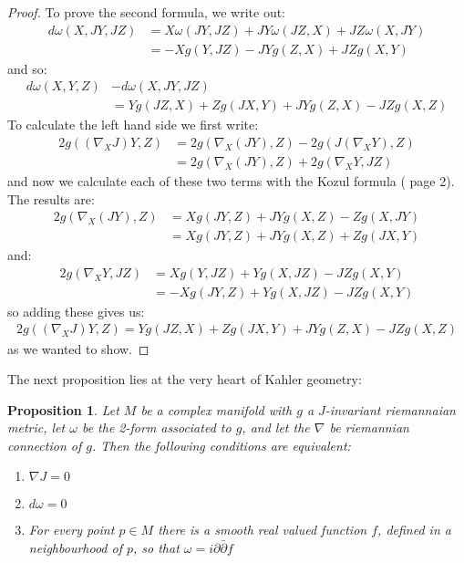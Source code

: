 \documentclass[11pt]{amsart}
\newtheorem{prop}[subsection]{Proposition}
\theoremstyle{definition}
\def \del{ \partial }
\def \delbar{ \bar{\partial} }
\begin{document}
\begin{proof}
To prove the second formula, we write out:
%
\begin{align*}
d \omega( X, JY, JZ ) &= X \omega( JY, JZ ) + JY \omega( JZ, X ) + JZ \omega( X, JY ) \\
&= - X g( Y, JZ ) - JY g( Z, X ) + JZ g( X, Y )
\end{align*}
%
and so:
%
\begin{align*}
d \omega( X, Y, Z ) &- d \omega( X, JY, JZ ) \\
&= Y g( JZ, X ) + Z g( JX, Y ) + JY g( Z, X ) - JZ g(X, Z)
\end{align*}
%
To calculate the left hand side we first write:
%
\begin{align*}
2 g( (\nabla_X J)Y, Z ) &= 2 g( \nabla_X (JY), Z ) - 2 g( J( \nabla_X Y ), Z ) \\
&= 2 g( \nabla_X (JY), Z ) + 2 g( \nabla_X Y, JZ )
\end{align*}
%
and now we calculate each of these two terms with the Kozul formula (\cite{CE} page 2).  The results are:
%
\begin{align*}
2 g( \nabla_X (JY), Z ) &= X g( JY, Z ) + JY g( X, Z ) - Z g( X, JY ) \\
&= X g( JY, Z ) + JY g( X, Z ) + Z g( JX, Y ) 
\end{align*}
%
and:
%
\begin{align*}
2 g( \nabla_X Y, JZ ) &= X g( Y, JZ ) + Y g( X, JZ ) - JZ g( X, Y ) \\
&=  - X g( JY, Z ) + Y g( X, JZ ) - JZ g( X, Y )
\end{align*}
%
so adding these gives us:
%
\begin{align*}
2 g( (\nabla_X J)Y, Z ) = Y g( JZ, X ) + Z g( JX, Y ) + JY g( Z, X ) - JZ g(X, Z)
\end{align*}
%
as we wanted to show.
%
\end{proof}
%
The next proposition lies at the very heart of Kahler geometry:
%
\begin{prop} Let $M$ be a complex manifold with $g$ a $J$-invariant riemannaian metric, let $\omega$ be the 2-form associated to $g$, and let the $\nabla$ be riemannian connection of $g$.  Then the following conditions are equivalent:
%
\begin{enumerate}
%
\item $ \nabla J = 0 $
%
\item $ d \omega = 0 $
%
\item For every point $p \in M$ there is a smooth real valued function $f$, defined in a neighbourhood of $p$, so that $ \omega = i \del \delbar f$
%
\end{enumerate}
%
\end{prop}
\end{document}

